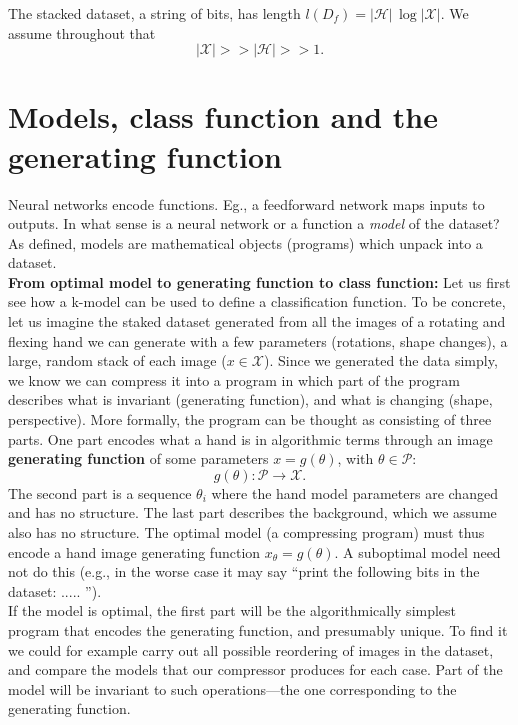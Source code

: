 \documentclass[11pt]{amsart}
\newcommand{\inputspace}{\mathcal X}
\newcommand{\handspace}{\mathcal H}
\begin{document}
The stacked dataset, a string of bits, has length $
l(D_{f})=|\handspace|\, \log |\inputspace|
$. We assume throughout that 
$$
|\inputspace| >>|\handspace|>>1.
$$

\section{Models, class function and the generating function}

Neural networks encode functions. Eg., a feedforward network maps inputs to outputs.   In what sense is a neural network or a function  a {\em model} of  the dataset? 
As  defined, models are mathematical objects (programs) which unpack into a dataset.  \\ 

{\bf From optimal model to generating function to class function:} Let us first see how a k-model can be used to define a classification function. To be  concrete, let us imagine the staked dataset generated from all the images  of a rotating and flexing hand we can generate with a few parameters (rotations, shape changes), a large, random stack of each image ($x \in \inputspace$). Since we generated the data simply, we know we can compress it into a program in which part of the program  describes what is invariant (generating function), and what is changing (shape, perspective).  More formally, the program can be thought as consisting of three parts. One part encodes what a hand is in algorithmic terms through an image  {\bf  generating function} of some parameters  $x=g(\theta)$, with $\theta \in \mathcal P$: 
$$
g(\theta): \mathcal P \longrightarrow \inputspace
.
$$
The second part is  a sequence $\theta_{i}$  where the hand model parameters are changed and has no structure. The last part describes the background, which we assume also  has no structure.   The optimal model (a compressing program) must thus encode a hand image generating function $x_{\theta}=g(\theta)$. A suboptimal model need not do this (e.g., in the worse case it may say ``print the following bits in the dataset: ..... '').\\

 If the model is optimal, the first part will be the algorithmically simplest program that encodes the generating function, and presumably unique.  To find it we could for example carry out all possible reordering of images in the dataset, and compare the models that our compressor produces for each case. Part of the model will be invariant to such operations---the one corresponding to the generating function.  \\
 
\end{document}
